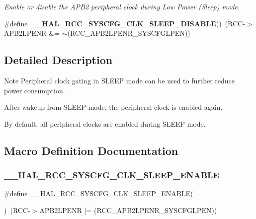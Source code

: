 \begin{DoxyCompactItemize}
\begin{DoxyCompactList}\small\item\em Enable or disable the A\+P\+B2 peripheral clock during Low Power (Sleep) mode. \end{DoxyCompactList}\item 
\mbox{\label{group___r_c_c___peripheral___clock___sleep___enable___disable_ga04863ff5c2174552387c549f0410df43}} 
\#define {\bfseries \+\_\+\+\_\+\+H\+A\+L\+\_\+\+R\+C\+C\+\_\+\+S\+Y\+S\+C\+F\+G\+\_\+\+C\+L\+K\+\_\+\+S\+L\+E\+E\+P\+\_\+\+D\+I\+S\+A\+B\+LE}()~(R\+CC-\/$>$A\+P\+B2\+L\+P\+E\+NR \&= $\sim$(R\+C\+C\+\_\+\+A\+P\+B2\+L\+P\+E\+N\+R\+\_\+\+S\+Y\+S\+C\+F\+G\+L\+P\+EN))
\end{DoxyCompactItemize}


\subsection{Detailed Description}
\begin{DoxyNote}{Note}
Peripheral clock gating in S\+L\+E\+EP mode can be used to further reduce power consumption. 

After wakeup from S\+L\+E\+EP mode, the peripheral clock is enabled again. 

By default, all peripheral clocks are enabled during S\+L\+E\+EP mode. 
\end{DoxyNote}


\subsection{Macro Definition Documentation}
\mbox{\label{group___r_c_c___peripheral___clock___sleep___enable___disable_ga6e3a8ca9e554e3aa7aba57d034725655}} 
\subsubsection{\texorpdfstring{\_\_HAL\_RCC\_SYSCFG\_CLK\_SLEEP\_ENABLE}{\_\_HAL\_RCC\_SYSCFG\_CLK\_SLEEP\_ENABLE}}
{\footnotesize\ttfamily \#define \+\_\+\+\_\+\+H\+A\+L\+\_\+\+R\+C\+C\+\_\+\+S\+Y\+S\+C\+F\+G\+\_\+\+C\+L\+K\+\_\+\+S\+L\+E\+E\+P\+\_\+\+E\+N\+A\+B\+LE(\begin{DoxyParamCaption}{ }\end{DoxyParamCaption})~(R\+CC-\/$>$A\+P\+B2\+L\+P\+E\+NR $\vert$= (R\+C\+C\+\_\+\+A\+P\+B2\+L\+P\+E\+N\+R\+\_\+\+S\+Y\+S\+C\+F\+G\+L\+P\+EN))}



